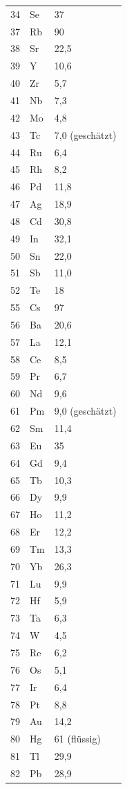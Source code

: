 \documentclass[12pt,a4paper]{article}
\begin{document}
\begin{longtable}{p{0.6cm}p{1.2cm}p{1.5cm}}
		34 & Se & 37 \\
		37 & Rb & 90 \\
		38 & Sr & 22,5 \\
		39 & Y  & 10,6 \\
		40 & Zr & 5,7 \\
		41 & Nb & 7,3 \\
		42 & Mo & 4,8 \\
		43 & Tc & 7,0 (geschätzt) \\
		44 & Ru & 6,4 \\
		45 & Rh & 8,2 \\
		46 & Pd & 11,8 \\
		47 & Ag & 18,9 \\
		48 & Cd & 30,8 \\
		49 & In & 32,1 \\
		50 & Sn & 22,0 \\
		51 & Sb & 11,0 \\
		52 & Te & 18 \\
		55 & Cs & 97 \\
		56 & Ba & 20,6 \\
		57 & La & 12,1 \\
		58 & Ce & 8,5 \\
		59 & Pr & 6,7 \\
		60 & Nd & 9,6 \\
		61 & Pm & 9,0 (geschätzt) \\
		62 & Sm & 11,4 \\
		63 & Eu & 35 \\
		64 & Gd & 9,4 \\
		65 & Tb & 10,3 \\
		66 & Dy & 9,9 \\
		67 & Ho & 11,2 \\
		68 & Er & 12,2 \\
		69 & Tm & 13,3 \\
		70 & Yb & 26,3 \\
		71 & Lu & 9,9 \\
		72 & Hf & 5,9 \\
		73 & Ta & 6,3 \\
		74 & W  & 4,5 \\
		75 & Re & 6,2 \\
		76 & Os & 5,1 \\
		77 & Ir & 6,4 \\
		78 & Pt & 8,8 \\
		79 & Au & 14,2 \\
		80 & Hg & 61 (flüssig) \\
		81 & Tl & 29,9 \\
		82 & Pb & 28,9 \\
	\end{longtable}
	
\end{document}
